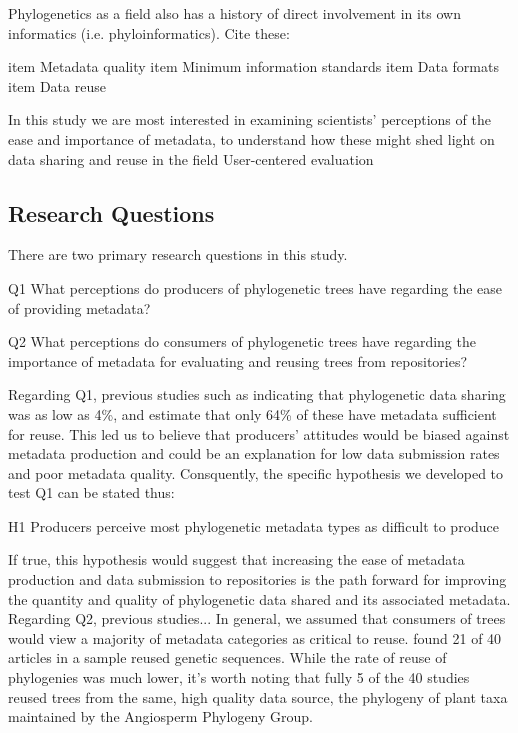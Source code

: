 \documentclass[12pt]{scrartcl}
\begin{document}
\begin{multicols}{2}
Phylogenetics as a field also has a history of direct involvement in its own informatics (i.e. phyloinformatics). %
Cite these:
\begin{itemize}
	item Metadata quality
	item Minimum information standards \citep{Leebens-Mack2006}
	item Data formats \citep{Vos2012}
	item Data reuse
\end{itemize}

In this study we are most interested in examining scientists' perceptions of the ease and importance of metadata, to understand how these might shed light on data sharing and reuse in the field
User-centered evaluation

\subsection{Research Questions}
There are two primary research questions in this study.  
\begin{compactitem}
	\item[Q1] What perceptions do producers of phylogenetic trees have regarding the ease of providing metadata?
	\item[Q2] What perceptions do consumers of phylogenetic trees have regarding the importance of metadata for evaluating and reusing trees from repositories?
\end{compactitem}
Regarding Q1, previous studies such as \citet{Stoltzfus2012} indicating that phylogenetic data sharing was as low as 4\%, and \citet{Drew2013} estimate that only 64\% of these have metadata sufficient for reuse. This led us to believe that producers' attitudes would be biased against metadata production and could be an explanation for low data submission rates and poor metadata quality.  Consquently, the specific hypothesis we developed to test Q1 can be stated thus:
\begin{compactitem}
	\item[H1] Producers perceive most phylogenetic metadata types as difficult to produce
\end{compactitem}
If true, this hypothesis would suggest that increasing the ease of metadata production and data submission to repositories is the path forward for improving the quantity and quality of phylogenetic data shared and its associated metadata.
Regarding Q2, previous studies...%
In general, we assumed that consumers of trees would view a majority of metadata categories as critical to reuse.  \citet{Stoltzfus2012} found 21 of 40 articles in a sample reused genetic sequences.  While the rate of reuse of phylogenies was much lower, it's worth noting that fully 5 of the 40 studies reused trees from the same, high quality data source, the phylogeny of plant taxa maintained by the Angiosperm Phylogeny Group. %

\end{multicols}
\end{document}
